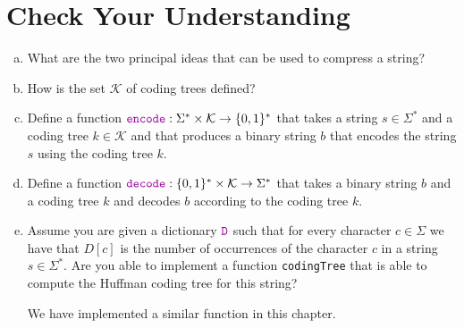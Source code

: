 \section{Check Your Understanding}
\begin{enumerate}[(a)]
\item What are the two principal ideas that can be used to compress a string?  
\item How is the set $\mathcal{K}$ of coding trees defined?
\item Define a function $\mytt{encode}: \Sigma^* \times \mathcal{K} \rightarrow \{0,1\}^*$
      that takes a string $s \in \Sigma^*$ and a coding tree $k \in \mathcal{K}$ and that produces
      a binary string $b$ that encodes the string $s$ using the coding tree $k$.
\item Define a function $\mytt{decode}:\{0,1\}^* \times \mathcal{K} \rightarrow \Sigma^*$ that takes a binary
      string $b$ and a coding tree $k$ and decodes $b$ according to the coding tree $k$.      
\item Assume you are given a dictionary $\mytt{D}$ such that for every character $c\in \Sigma$ we have that
      $D[c]$ is the number of occurrences of the character $c$ in a string $s \in \Sigma^*$.
      Are you able to implement a function \texttt{codingTree} that is able to compute the Huffman
      coding tree for this string?

      \hint
      We have implemented a similar function in this chapter.
\end{enumerate}

